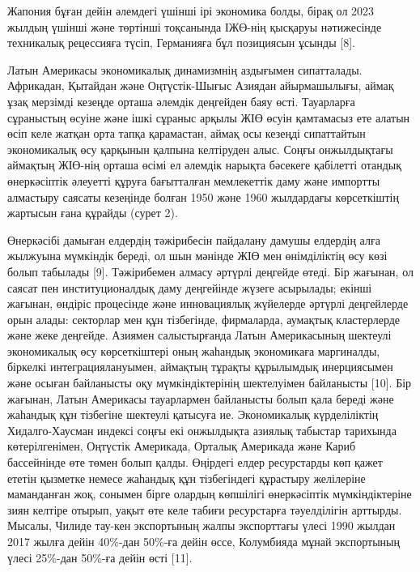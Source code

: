 \begin{multicols}{2}
Жапония бұған дейін әлемдегі үшінші ірі экономика болды, бірақ ол 2023
жылдың үшінші және төртінші тоқсанында ІЖӨ-нің қысқаруы нәтижесінде
техникалық рецессияға түсіп, Германияға бұл позициясын ұсынды {[}8{]}.

Латын Америкасы экономикалық динамизмнің аздығымен сипатталады.
Африкадан, Қытайдан және Оңтүстік-Шығыс Азиядан айырмашылығы, аймақ ұзақ
мерзімді кезеңде орташа әлемдік деңгейден баяу өсті. Тауарларға
сұраныстың өсуіне және ішкі сұраныс арқылы ЖІӨ өсуін қамтамасыз ете
алатын өсіп келе жатқан орта тапқа қарамастан, аймақ осы кезеңді
сипаттайтын экономикалық өсу қарқынын қалпына келтіруден алыс. Соңғы
онжылдықтағы аймақтың ЖІӨ-нің орташа өсімі ел әлемдік нарықта бәсекеге
қабілетті отандық өнеркәсіптік әлеуетті құруға бағытталған мемлекеттік
даму және импортты алмастыру саясаты кезеңінде болған 1950 және 1960
жылдардағы көрсеткіштің жартысын ғана құрайды (сурет 2).

Өнеркәсібі дамыған елдердің тәжірибесін пайдалану дамушы елдердің алға
жылжуына мүмкіндік береді, ол шын мәнінде ЖІӨ мен өнімділіктің өсу көзі
болып табылады {[}9{]}. Тәжірибемен алмасу әртүрлі деңгейде өтеді. Бір
жағынан, ол саясат пен институционалдық даму деңгейінде жүзеге
асырылады; екінші жағынан, өндіріс процесінде және инновациялық
жүйелерде әртүрлі деңгейлерде орын алады: секторлар мен құн тізбегінде,
фирмаларда, аумақтық кластерлерде және жеке деңгейде. Азиямен
салыстырғанда Латын Америкасының шектеулі экономикалық өсу көрсеткіштері
оның жаһандық экономикаға маргиналды, біркелкі интеграциялануымен,
аймақтың тұрақты құрылымдық инерциясымен және осыған байланысты оқу
мүмкіндіктерінің шектелуімен байланысты {[}10{]}. Бір жағынан, Латын
Америкасы тауарлармен байланысты болып қала береді және жаһандық құн
тізбегіне шектеулі қатысуға ие. Экономикалық күрделіліктің
Хидалго-Хаусман индексі соңғы екі онжылдықта азиялық табыстар тарихында
көтерілгенімен, Оңтүстік Америкада, Орталық Америкада және Кариб
бассейнінде өте төмен болып қалды. Өңірдегі елдер ресурстарды көп қажет
ететін қызметке немесе жаһандық құн тізбегіндегі құрастыру желілеріне
маманданған жоқ, сонымен бірге олардың көпшілігі өнеркәсіптік
мүмкіндіктеріне зиян келтіре отырып, уақыт өте келе табиғи ресурстарға
тәуелділігін арттырды. Мысалы, Чилиде тау-кен экспортының жалпы
экспорттағы үлесі 1990 жылдан 2017 жылға дейін 40\%-дан 50\%-ға дейін
өссе, Колумбияда мұнай экспортының үлесі 25\%-дан 50\%-ға дейін өсті
{[}11{]}.
\end{multicols}

